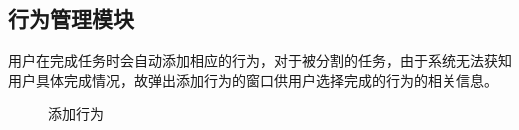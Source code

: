 \subsection{行为管理模块}

用户在完成任务时会自动添加相应的行为，对于被分割的任务，由于系统无法获知
用户具体完成情况，故弹出添加行为的窗口供用户选择完成的行为的相关信息。

\begin{figure}[H]
	\centering
	\caption{添加行为}
\end{figure}

